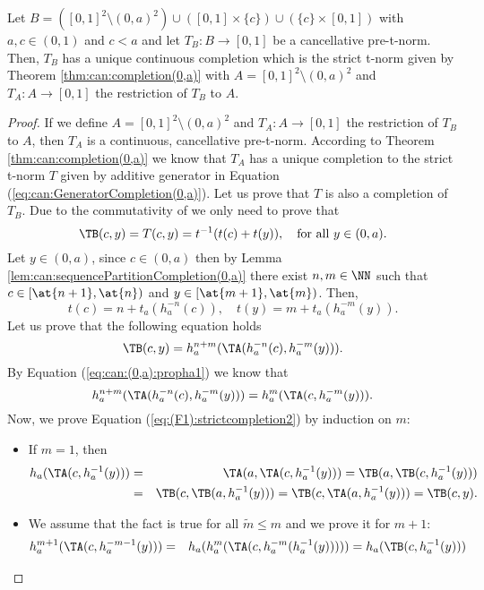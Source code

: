 \begin{corollary}\label{cor:strictcompletion2} Let $B = ([0,1]^2 \setminus (0,a)^2) \cup ([0,1]\times \{c\}) \cup (\{c\} \times [0,1])$ with $a,c \in (0,1)$ and $c<a$ and let $T_{B}:B \to [0,1]$ be a cancellative pre-t-norm. Then, $T_B$ has a unique continuous completion which is the strict t-norm given by Theorem \ref{thm:can:completion(0,a)} with $A=[0,1]^2 \setminus (0,a)^2$ and $T_A:A \to [0,1]$ the restriction of $T_B$ to $A$.
\end{corollary}
\begin{proof}
	If we define $A=[0,1]^2 \setminus (0,a)^2$ and $T_A:A \to [0,1]$ the restriction of $T_B$ to $A$, then $T_A$ is a continuous, cancellative pre-t-norm. According to Theorem \ref{thm:can:completion(0,a)} we know that $T_A$ has a unique completion to the strict t-norm $T$ given by additive generator in Equation (\ref{eq:can:GeneratorCompletion(0,a)}). Let us prove that $T$ is also a completion of $T_B$. Due to the commutativity of \TB we only  need to prove that
	$$\TB(c,y)=T(c,y)=t^{-1}(t(c)+t(y)), \quad \text{for all } y \in (0,a).$$
	Let $y \in (0,a)$, since $c \in (0,a)$ then by Lemma \ref{lem:can:sequencePartitionCompletion(0,a)} there exist $n,m \in \NN$ such that $c \in [\at{n+1},\at{n})$ and $y \in [\at{m+1},\at{m})$. Then,
	$$t(c)=n+t_a(h_a^{-n}(c)), \quad t(y)=m+t_a(h_a^{-m}(y)).$$
	Let us prove that the following equation holds
	\begin{equation}\label{eq:(F1):strictcompletion2}
	\TB(c,y)=h_a^{n+m}(\TA(h_a^{-n}(c),h_a^{-m}(y))).
	\end{equation}
	By Equation (\ref{eq:can:(0,a):propha1}) we know that
	$$h_a^{n+m}(\TA(h_a^{-n}(c),h_a^{-m}(y)))=h_a^m(\TA(c,h_a^{-m}(y))).$$
	Now, we prove Equation (\ref{eq:(F1):strictcompletion2}) by induction on $m$:
	\begin{itemize}
		\item If $m=1$, then 
		\begin{eqnarray*}
		h_a(\TA(c,h_a^{-1}(y)))&=&\TA(a,\TA(c,h_a^{-1}(y))) = \TB(a,\TB(c,h_a^{-1}(y)))\\
		 &=& \TB(c,\TB(a,h_a^{-1}(y))) = \TB(c,\TA(a,h_a^{-1}(y))) = \TB(c,y).
		\end{eqnarray*}
		\item We assume that the fact is true for all $\tilde{m}\leq m$ and we prove it for $m+1$:
		\begin{eqnarray*}
			h_a^{m+1}(\TA(c,h_a^{-m-1}(y)))&=&h_a(h_a^m(\TA(c,h_a^{-m}(h_a^{-1}(y))))) = h_a(\TB(c,h_a^{-1}(y)))\\

\end{eqnarray*}
\end{itemize}
\end{proof}
